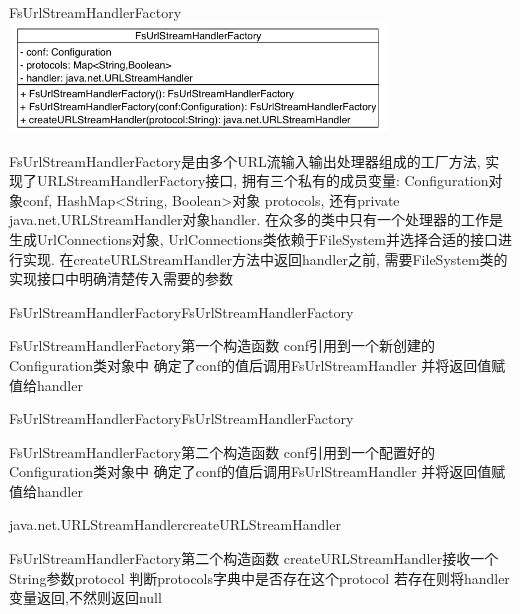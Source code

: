 \begin{XeClass}{FsUrlStreamHandlerFactory}
\includegraphics[width=10cm]{cdig/FsUrlStreamHandlerFactory.png}
     
 FsUrlStreamHandlerFactory是由多个URL流输入输出处理器组成的工厂方法,
 实现了URLStreamHandlerFactory接口,
 拥有三个私有的成员变量: Configuration对象conf,
 HashMap<String, Boolean>对象 protocols,
 还有private java.net.URLStreamHandler对象handler.
 在众多的类中只有一个处理器的工作是生成UrlConnections对象,
 UrlConnections类依赖于FileSystem并选择合适的接口进行实现.
 在createURLStreamHandler方法中返回handler之前,
 需要FileSystem类的实现接口中明确清楚传入需要的参数

    \begin{XeMethod}{\XePublic}{FsUrlStreamHandlerFactory}{FsUrlStreamHandlerFactory}
         
 FsUrlStreamHandlerFactory第一个构造函数
 conf引用到一个新创建的Configuration类对象中
 确定了conf的值后调用FsUrlStreamHandler
 并将返回值赋值给handler

    \end{XeMethod}

    \begin{XeMethod}{\XePublic}{FsUrlStreamHandlerFactory}{FsUrlStreamHandlerFactory}
         
 FsUrlStreamHandlerFactory第二个构造函数
 conf引用到一个配置好的Configuration类对象中
 确定了conf的值后调用FsUrlStreamHandler
 并将返回值赋值给handler

    \end{XeMethod}

    \begin{XeMethod}{\XePublic}{java.net.URLStreamHandler}{createURLStreamHandler}
         
 FsUrlStreamHandlerFactory第二个构造函数
 createURLStreamHandler接收一个String参数protocol
 判断protocols字典中是否存在这个protocol
 若存在则将handler变量返回,不然则返回null

    \end{XeMethod}

\end{XeClass}
